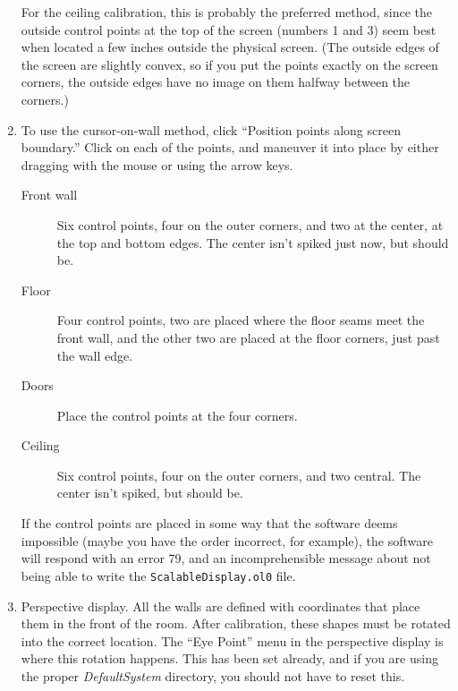 \documentclass[11pt]{article}
\newcommand{\cmd}[1]{\texttt{#1}\xspace}
\newcommand{\dir}[1]{\textit{#1}\xspace}
\newcommand{\menu}[1]{``#1''\xspace}
\begin{document}
\begin{enumerate}
  For the ceiling calibration, this is probably the preferred method,
  since the outside control points at the top of the screen (numbers 1
  and 3) seem best when located a few inches outside the physical
  screen.  (The outside edges of the screen are slightly convex, so if
  you put the points exactly on the screen corners, the outside edges
  have no image on them halfway between the corners.)

\item To use the cursor-on-wall method, click ``Position points along
  screen boundary.''  Click on each of the points, and maneuver it
  into place by either dragging with the mouse or using the arrow keys.

  \begin{description}

  \item[Front wall] Six control points, four on the outer corners, and
    two at the center, at the top and bottom edges.  The center isn't
    spiked just now, but should be.

  \item[Floor] Four control points, two are placed where the floor
    seams meet the front wall, and the other two are placed at the
    floor corners, just past the wall edge.

  \item[Doors] Place the control points at the four corners.

  \item[Ceiling] Six control points, four on the outer corners, and
    two central.  The center isn't spiked, but should be.

  \end{description}

  If the control points are placed in some way that the software deems
  impossible (maybe you have the order incorrect, for example), the
  software will respond with an error 79, and an incomprehensible
  message about not being able to write the \cmd{ScalableDisplay.ol0} file.

\item Perspective display.  All the walls are defined with coordinates
  that place them in the front of the room.  After calibration, these
  shapes must be rotated into the correct location.  The \menu{Eye Point}
  menu in the perspective display is where this rotation happens.
  This has been set already, and if you are using the proper
  \dir{DefaultSystem} directory, you should not have to reset this.


\end{enumerate}
\end{document}
